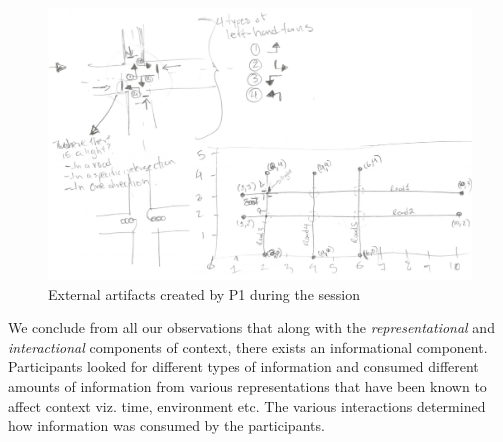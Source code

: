 \begin{figure}
\includegraphics[width=\columnwidth]{figures/P4sketches}
\caption{External artifacts created by P1 during the session}
\label{P4Sketch}
\end{figure}

We conclude from all our observations that along with the \textit{representational} and \textit{interactional} components of context, there exists an informational component. Participants looked for different types of information and consumed different amounts of information from various representations that have been known to affect context viz. time, environment etc. The various interactions determined how information was consumed by the participants. 